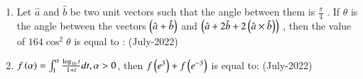 \documentclass[journal]{IEEEtran}
\begin{document}
\begin{enumerate}
\begin{enumerate}
\end{enumerate}
\item Let $\hat{a}$
 and $\hat{b}$
 be two unit vectors such that the angle between them is 
 $\frac{\pi}{4}$
. If $\theta$
 is the angle between the vectors $\left(\hat{a} + \hat{b}\right)$
 and $\left(\hat{a} + 2\hat{b} + 2\left(\hat{a}\times \hat{b}\right)\right)$
, then the value of $164 \cos^2\theta$
 is equal to : \hfill (July-2022)
 \begin{enumerate}
 \end{enumerate}
 \item $f\left(\alpha\right) = \int_1^{\alpha} \frac{\log_{10}t}{1 + t}dt, \alpha > 0$, then $f\left(e^3\right) + f\left(e^{-3}\right)$ is equal to: \hfill (July-2022)
 \begin{enumerate}
 \end{enumerate}
\end{enumerate}
\end{document}
